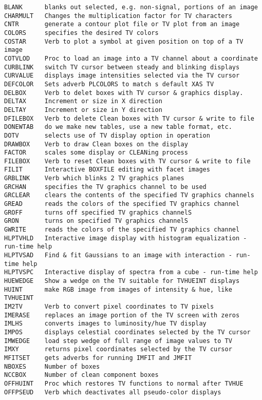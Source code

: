 \vskip 0.5pt
\bbve\begin{verbatim}
BLANK      blanks out selected, e.g. non-signal, portions of an image
CHARMULT   Changes the multiplication factor for TV characters
CNTR       generate a contour plot file or TV plot from an image
COLORS     specifies the desired TV colors
COSTAR     Verb to plot a symbol at given position on top of a TV image
COTVLOD    Proc to load an image into a TV channel about a coordinate
CURBLINK   switch TV cursor between steady and blinking displays
CURVALUE   displays image intensities selected via the TV cursor
DEFCOLOR   Sets adverb PLCOLORS to match s default XAS TV
DELBOX     Verb to delet boxes with TV cursor & graphics display.
DELTAX     Increment or size in X direction
DELTAY     Increment or size in Y direction
DFILEBOX   Verb to delete Clean boxes with TV cursor & write to file
DONEWTAB   do we make new tables, use a new table format, etc.
DOTV       selects use of TV display option in operation
DRAWBOX    Verb to draw Clean boxes on the display
FACTOR     scales some display or CLEANing process
FILEBOX    Verb to reset Clean boxes with TV cursor & write to file
FILIT      Interactive BOXFILE editing with facet images
GRBLINK    Verb which blinks 2 TV graphics planes
GRCHAN     specifies the TV graphics channel to be used
GRCLEAR    clears the contents of the specified TV graphics channels
GREAD      reads the colors of the specified TV graphics channel
GROFF      turns off specified TV graphics channelS
GRON       turns on specified TV graphics channelS
GWRITE     reads the colors of the specified TV graphics channel
HLPTVHLD   Interactive image display with histogram equalization - run-time help
HLPTVSAD   Find & fit Gaussians to an image with interaction - run-time help
HLPTVSPC   Interactive display of spectra from a cube - run-time help
HUEWEDGE   Show a wedge on the TV suitable for TVHUEINT displays
HUINT      make RGB image from images of intensity & hue, like TVHUEINT
IM2TV      Verb to convert pixel coordinates to TV pixels
IMERASE    replaces an image portion of the TV screen with zeros
IMLHS      converts images to luminosity/hue TV display
IMPOS      displays celestial coordinates selected by the TV cursor
IMWEDGE    load step wedge of full range of image values to TV
IMXY       returns pixel coordinates selected by the TV cursor
MFITSET    gets adverbs for running IMFIT and JMFIT
NBOXES     Number of boxes
NCCBOX     Number of clean component boxes
OFFHUINT   Proc which restores TV functions to normal after TVHUE
OFFPSEUD   Verb which deactivates all pseudo-color displays

\end{verbatim}

